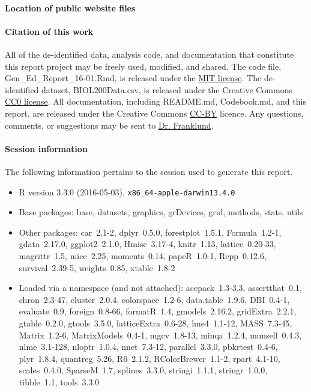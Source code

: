 \documentclass[fleqn,10pt]{SelfArx}\usepackage[]{graphicx}\usepackage[]{color}
\begin{document}
\paragraph{Location of public website files} \lipsum[1] %

\paragraph{Citation of this work}
All of the de-identified data, analysis code, and documentation that constitute this report project may be freely used, modified, and shared. The code file, Gen\_Ed\_Report\_16-01.Rmd, is released under the \href{https://opensource.org/licenses/MIT}{MIT license}. The de-identified dataset, BIOL200Data.csv, is released under the Creative Commons \href{https://creativecommons.org/publicdomain/zero/1.0/}{CC0 license}. All documentation, including README.md, Codebook.md, and this report, are released under the Creative Commons \href{https://creativecommons.org/licenses/by/4.0/}{CC-BY} licence. Any questions, comments, or suggestions may be sent to \href{mailto:CliftonFranklund@ferris.edu}{Dr. Franklund}.

\paragraph{Session information}
The following information pertains to the session used to generate this report.
\begin{itemize}\raggedright
  \item R version 3.3.0 (2016-05-03), \verb|x86_64-apple-darwin13.4.0|
  \item Base packages: base, datasets, graphics, grDevices, grid,
    methods, stats, utils
  \item Other packages: car~2.1-2, dplyr~0.5.0, forestplot~1.5.1,
    Formula~1.2-1, gdata~2.17.0, ggplot2~2.1.0, Hmisc~3.17-4,
    knitr~1.13, lattice~0.20-33, magrittr~1.5, mice~2.25,
    moments~0.14, papeR~1.0-1, Rcpp~0.12.6, survival~2.39-5,
    weights~0.85, xtable~1.8-2
  \item Loaded via a namespace (and not attached):
    acepack~1.3-3.3, assertthat~0.1, chron~2.3-47, cluster~2.0.4,
    colorspace~1.2-6, data.table~1.9.6, DBI~0.4-1, evaluate~0.9,
    foreign~0.8-66, formatR~1.4, gmodels~2.16.2, gridExtra~2.2.1,
    gtable~0.2.0, gtools~3.5.0, latticeExtra~0.6-28, lme4~1.1-12,
    MASS~7.3-45, Matrix~1.2-6, MatrixModels~0.4-1, mgcv~1.8-13,
    minqa~1.2.4, munsell~0.4.3, nlme~3.1-128, nloptr~1.0.4,
    nnet~7.3-12, parallel~3.3.0, pbkrtest~0.4-6, plyr~1.8.4,
    quantreg~5.26, R6~2.1.2, RColorBrewer~1.1-2, rpart~4.1-10,
    scales~0.4.0, SparseM~1.7, splines~3.3.0, stringi~1.1.1,
    stringr~1.0.0, tibble~1.1, tools~3.3.0
\end{itemize}
\end{document}
